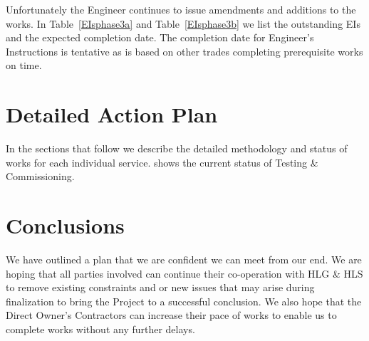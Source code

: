 Unfortunately the Engineer continues to issue amendments and additions to the works. In Table~\ref{EIsphase3a} and Table~\ref{EIsphase3b}  we list
the outstanding EIs and the expected completion date. The completion date for Engineer's Instructions is tentative as
is based on other trades completing prerequisite works on time.   
\vspace*{1.5cm}



\section*{Detailed Action Plan}

In the sections that follow we describe the detailed methodology and status of works for each individual service.  shows the current status of Testing \& Commissioning.



\section*{Conclusions}

We have outlined a plan that we are confident we can meet from our end. We are hoping that all parties involved can continue their co-operation with HLG \& HLS to remove existing constraints and or new issues that may arise during finalization to bring the Project to a successful conclusion. We also hope that the Direct Owner's Contractors can increase their pace of works to enable us to complete works without any further delays.



